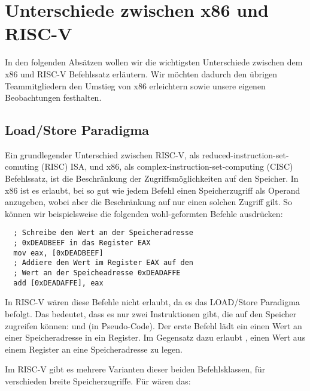 \section{Unterschiede zwischen x86 und RISC-V}

In den folgenden Absätzen wollen wir die wichtigsten Unterschiede zwischen dem
x86 und RISC-V Befehlssatz erläutern. Wir möchten dadurch den übrigen
Teammitgliedern den Umstieg von x86 erleichtern sowie unsere eigenen
Beobachtungen festhalten.

\subsection{Load/Store Paradigma}

Ein grundlegender Unterschied zwischen RISC-V, als
reduced-instruction-set-comuting (RISC) ISA, und x86, als
complex-instruction-set-computing (CISC) Befehlssatz, ist die Beschränkung der
Zugriffsmöglichkeiten auf den Speicher. In x86 ist es erlaubt, bei so gut wie
jedem Befehl einen Speicherzugriff als Operand anzugeben, wobei aber die
Beschränkung auf nur einen solchen Zugriff gilt. So können wir beispielsweise
die folgenden wohl-geformten Befehle ausdrücken:

\begin{lstlisting}
  ; Schreibe den Wert an der Speicheradresse
  ; 0xDEADBEEF in das Register EAX
  mov eax, [0xDEADBEEF]
  ; Addiere den Wert im Register EAX auf den
  ; Wert an der Speicheadresse 0xDEADAFFE
  add [0xDEADAFFE], eax
\end{lstlisting}

In RISC-V wären diese Befehle nicht erlaubt, da es das LOAD/Store Paradigma
befolgt. Das bedeutet, dass es nur zwei Instruktionen gibt, die auf den Speicher
zugreifen können:  und  (in Pseudo-Code). Der erste
Befehl lädt ein einen Wert an einer Speicheradresse in ein Register. Im
Gegensatz dazu erlaubt , einen Wert aus einem Register an eine
Speicheradresse zu legen.

Im RISC-V gibt es mehrere Varianten dieser beiden Befehlsklassen, für
verschieden breite Speicherzugriffe. Für  wären das:

